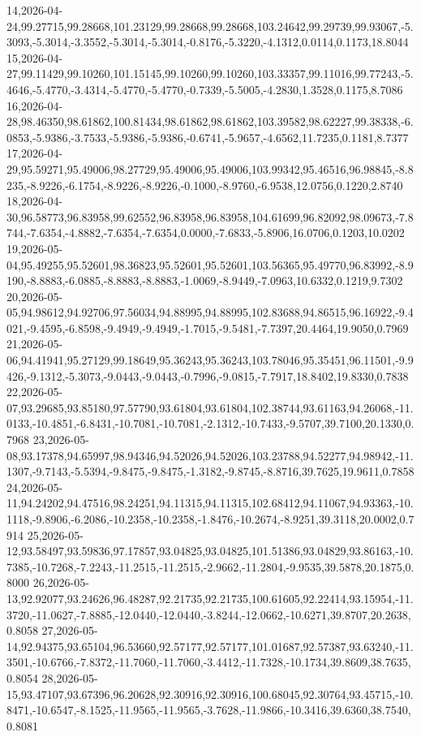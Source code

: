 \documentclass{eic-bcc-tcc}
\begin{document}
{14,2026-04-24,99.27715,99.28668,101.23129,99.28668,99.28668,103.24642,99.29739,99.93067,-5.3093,-5.3014,-3.3552,-5.3014,-5.3014,-0.8176,-5.3220,-4.1312,0.0114,0.1173,18.8044
15,2026-04-27,99.11429,99.10260,101.15145,99.10260,99.10260,103.33357,99.11016,99.77243,-5.4646,-5.4770,-3.4314,-5.4770,-5.4770,-0.7339,-5.5005,-4.2830,1.3528,0.1175,8.7086
16,2026-04-28,98.46350,98.61862,100.81434,98.61862,98.61862,103.39582,98.62227,99.38338,-6.0853,-5.9386,-3.7533,-5.9386,-5.9386,-0.6741,-5.9657,-4.6562,11.7235,0.1181,8.7377
17,2026-04-29,95.59271,95.49006,98.27729,95.49006,95.49006,103.99342,95.46516,96.98845,-8.8235,-8.9226,-6.1754,-8.9226,-8.9226,-0.1000,-8.9760,-6.9538,12.0756,0.1220,2.8740
18,2026-04-30,96.58773,96.83958,99.62552,96.83958,96.83958,104.61699,96.82092,98.09673,-7.8744,-7.6354,-4.8882,-7.6354,-7.6354,0.0000,-7.6833,-5.8906,16.0706,0.1203,10.0202
19,2026-05-04,95.49255,95.52601,98.36823,95.52601,95.52601,103.56365,95.49770,96.83992,-8.9190,-8.8883,-6.0885,-8.8883,-8.8883,-1.0069,-8.9449,-7.0963,10.6332,0.1219,9.7302
20,2026-05-05,94.98612,94.92706,97.56034,94.88995,94.88995,102.83688,94.86515,96.16922,-9.4021,-9.4595,-6.8598,-9.4949,-9.4949,-1.7015,-9.5481,-7.7397,20.4464,19.9050,0.7969
21,2026-05-06,94.41941,95.27129,99.18649,95.36243,95.36243,103.78046,95.35451,96.11501,-9.9426,-9.1312,-5.3073,-9.0443,-9.0443,-0.7996,-9.0815,-7.7917,18.8402,19.8330,0.7838
22,2026-05-07,93.29685,93.85180,97.57790,93.61804,93.61804,102.38744,93.61163,94.26068,-11.0133,-10.4851,-6.8431,-10.7081,-10.7081,-2.1312,-10.7433,-9.5707,39.7100,20.1330,0.7968
23,2026-05-08,93.17378,94.65997,98.94346,94.52026,94.52026,103.23788,94.52277,94.98942,-11.1307,-9.7143,-5.5394,-9.8475,-9.8475,-1.3182,-9.8745,-8.8716,39.7625,19.9611,0.7858
24,2026-05-11,94.24202,94.47516,98.24251,94.11315,94.11315,102.68412,94.11067,94.93363,-10.1118,-9.8906,-6.2086,-10.2358,-10.2358,-1.8476,-10.2674,-8.9251,39.3118,20.0002,0.7914
25,2026-05-12,93.58497,93.59836,97.17857,93.04825,93.04825,101.51386,93.04829,93.86163,-10.7385,-10.7268,-7.2243,-11.2515,-11.2515,-2.9662,-11.2804,-9.9535,39.5878,20.1875,0.8000
26,2026-05-13,92.92077,93.24626,96.48287,92.21735,92.21735,100.61605,92.22414,93.15954,-11.3720,-11.0627,-7.8885,-12.0440,-12.0440,-3.8244,-12.0662,-10.6271,39.8707,20.2638,0.8058
27,2026-05-14,92.94375,93.65104,96.53660,92.57177,92.57177,101.01687,92.57387,93.63240,-11.3501,-10.6766,-7.8372,-11.7060,-11.7060,-3.4412,-11.7328,-10.1734,39.8609,38.7635,0.8054
28,2026-05-15,93.47107,93.67396,96.20628,92.30916,92.30916,100.68045,92.30764,93.45715,-10.8471,-10.6547,-8.1525,-11.9565,-11.9565,-3.7628,-11.9866,-10.3416,39.6360,38.7540,0.8081
}
\end{document}

